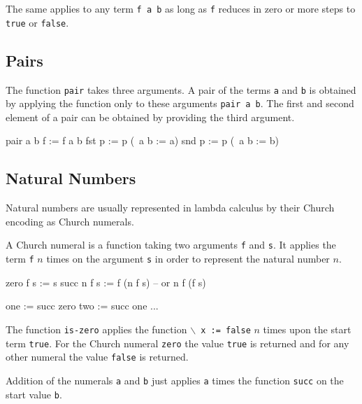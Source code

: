 \documentclass[12pt]{article}
\begin{document}
The same applies to any term {\tt f a b} as long as {\tt f} reduces in zero or
more steps to {\tt true} or {\tt false}.





\subsection{Pairs}
\label{sec-pairs}

The function {\tt pair} takes three arguments. A pair of the terms {\tt a} and
{\tt b} is obtained by applying the function only to these arguments {\tt pair a
b}. The first and second element of a pair can be obtained by providing the
third argument.

\begin{lam}
    pair a b f := f a b
    fst  p     := p (\ a b := a)
    snd  p     := p (\ a b := b)
\end{lam}







\subsection{Natural Numbers}
\label{sec-natural-numbers}


Natural numbers are usually represented in lambda calculus by their Church
encoding as Church numerals.

A Church numeral is a function taking two arguments {\tt f} and {\tt s}. It
applies the term {\tt f} $n$ times on the argument {\tt s} in order to represent
the natural number $n$.

\begin{lam}
    zero    f s  := s
    succ n  f s  := f (n f s) -- or n f (f s)

    one := succ zero
    two := succ one
    ...

\end{lam}


The function {\tt is-zero} applies the function {\tt $\backslash$ x := false}
$n$ times upon the start term {\tt true}. For the Church numeral {\tt zero} the
value {\tt true} is returned and for any other numeral the value {\tt false} is
returned.

Addition of the numerals {\tt a} and {\tt b} just applies {\tt a} times the
function {\tt succ} on the start value {\tt b}.
\end{document}

